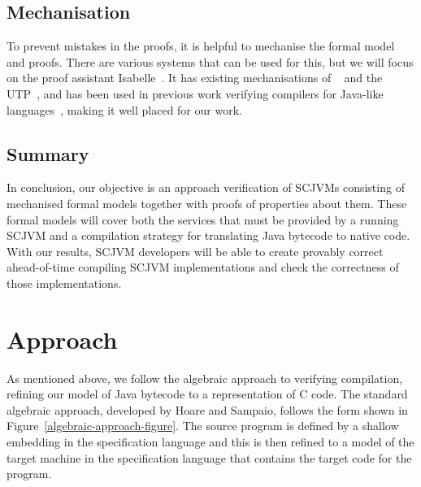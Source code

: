 \subsection{Mechanisation}

To prevent mistakes in the proofs, it is helpful to mechanise the
formal model and proofs.
There are various systems that can be used for this, but we will focus
on the proof assistant Isabelle~\cite{nipkow2002, nipkow2014}.
It has existing mechanisations of \Circus{}~\cite{feliachi2012} and
the UTP~\cite{foster2015}, and has been used in previous work
verifying compilers for Java-like languages~\cite{klein2006,
  strecker2002, lochbihler2010}, making it well placed for our work.

\subsection{Summary}

In conclusion, our objective is an approach verification of SCJVMs
consisting of mechanised formal models together with proofs of
properties about them.
These formal models will cover both the services that must be provided
by a running SCJVM and a compilation strategy for translating Java
bytecode to native code.
With our results, SCJVM developers will be able to create provably
correct ahead-of-time compiling SCJVM implementations and check the
correctness of those implementations.

\section{Approach}

As mentioned above, we follow the algebraic approach to verifying
compilation, refining our model of Java bytecode to a representation
of C code.
The standard algebraic approach, developed by Hoare and Sampaio,
follows the form shown in Figure~\ref{algebraic-approach-figure}.
The source program is defined by a shallow embedding in the
specification language and this is then refined to a model of the
target machine in the specification language that contains the target
code for the program.

